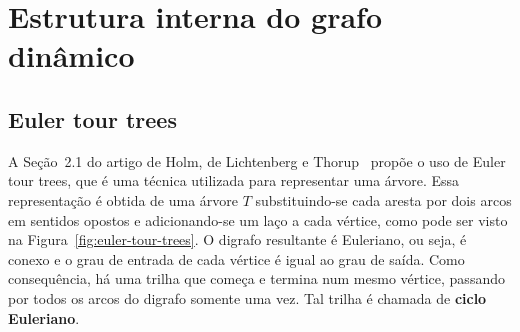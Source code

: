 \section{Estrutura interna do grafo dinâmico}
\label{sec:dynamic-graph-implementation}

\subsection{Euler tour trees}
\label{sec:euler-tour-trees}

A Seção~2.1 do artigo de Holm, de Lichtenberg e Thorup~\cite{jacob_holm} propõe o uso de Euler tour trees, que é uma técnica utilizada para representar uma árvore. Essa representação é obtida de uma árvore $T$ substituindo-se cada aresta por dois arcos em sentidos opostos e adicionando-se um laço a cada vértice, como pode ser visto na Figura~\ref{fig:euler-tour-trees}. O digrafo resultante é Euleriano, ou seja, é conexo e o grau de entrada de cada vértice é igual ao grau de saída. Como consequência, há uma trilha que começa e termina num mesmo vértice, passando por todos os arcos do digrafo somente uma vez. Tal trilha é chamada de \textbf{ciclo Euleriano}.

